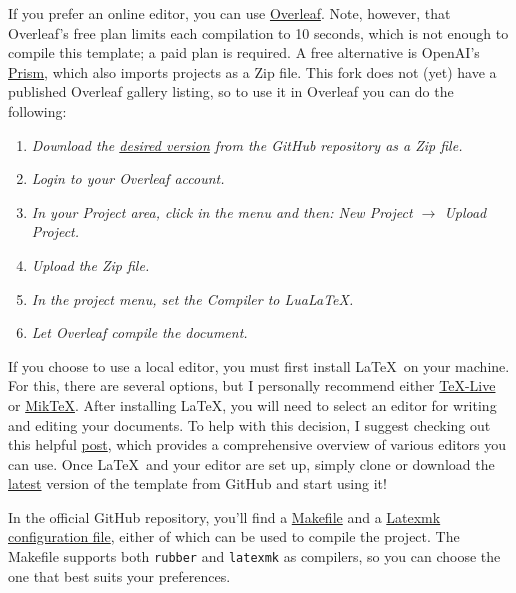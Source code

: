 If you prefer an online editor, you can use \href{https://www.overleaf.com/}{Overleaf}. Note, however, that Overleaf's free plan limits each compilation to 10 seconds, which is not enough to compile this template; a paid plan is required. A free alternative is OpenAI's \href{https://prism.openai.com/}{Prism}, which also imports projects as a Zip file. This fork does not (yet) have a published Overleaf gallery listing, so to use it in Overleaf you can do the following:

\begin{enumerate}[font=\itshape]
    \setlength{\itemsep}{.375em}
    \item \textit{Download the \href{https://github.com/mfrade/ULO-thesis/releases}{desired version} from the GitHub repository as a Zip file.}
    \item \textit{Login to your Overleaf account.}
    \item \textit{In your Project area, click in the menu and then: New Project \(\to\) Upload Project.}
    \item \textit{Upload the Zip file.}
    \item \textit{In the project menu, set the Compiler to LuaLaTeX.}
    \item \textit{Let Overleaf compile the document.}
\end{enumerate}

If you choose to use a local editor, you must first install \LaTeX~on your machine. For this, there are several options, but I personally recommend either \href{https://www.tug.org/texlive/}{TeX-Live} or \href{https://miktex.org/}{MikTeX}. After installing \LaTeX, you will need to select an editor for writing and editing your documents. To help with this decision, I suggest checking out this helpful \href{https://tex.stackexchange.com/questions/339/latex-editors-ides}{post}, which provides a comprehensive overview of various editors you can use. Once \LaTeX~and your editor are set up, simply clone or download the \href{https://github.com/mfrade/ULO-thesis/releases}{latest} version of the template from GitHub and start using it!

\begin{block}[tip]
    In the official GitHub repository, you'll find a \href{https://github.com/mfrade/ULO-thesis/blob/master/Makefile}{Makefile} and a \href{https://github.com/mfrade/ULO-thesis/blob/master/.latexmkrc}{Latexmk configuration file}, either of which can be used to compile the project. The Makefile supports both \texttt{rubber} and \texttt{latexmk} as compilers, so you can choose the one that best suits your preferences.
\end{block}

